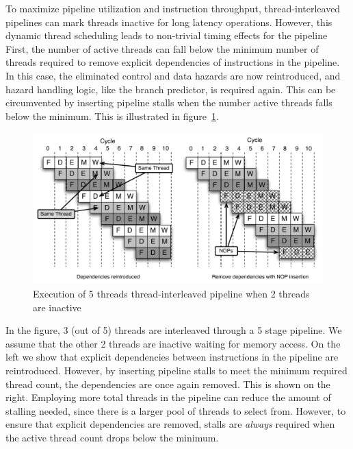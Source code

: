 To maximize pipeline utilization and instruction throughput, thread-interleaved pipelines can mark threads inactive for long latency operations.   
However, this dynamic thread scheduling leads to non-trivial timing effects for the pipeline 
First, the number of active threads can fall below the minimum number of threads required to remove explicit dependencies of instructions in the pipeline.
In this case, the eliminated control and data hazards are now reintroduced, and hazard handling logic, like the branch predictor, is required again. 
This can be circumvented by inserting pipeline stalls when the number active threads falls below the minimum.
This is illustrated in figure~\ref{fig:three_thread_pipeline}.
\begin{figure}[h]
  \vspace{-10pt}
  \begin{center}
    \includegraphics[scale=.6]{figs/three_thread_pipeline}
  \end{center}
  \vspace{-10pt}
  \caption{Execution of 5 threads thread-interleaved pipeline when 2 threads are inactive}
  \label{fig:three_thread_pipeline}
\end{figure}
In the figure, 3 (out of 5) threads are interleaved through a 5 stage pipeline. 
We assume that the other 2 threads are inactive waiting for memory access.    
On the left we show that explicit dependencies between instructions in the pipeline are reintroduced.
However, by inserting pipeline stalls to meet the minimum required thread count, the dependencies are once again removed.
This is shown on the right.   
Employing more total threads in the pipeline can reduce the amount of stalling needed, since there is a larger pool of threads to select from.  
However, to ensure that explicit dependencies are removed, stalls are \emph{always} required when the active thread count drops below the minimum.


